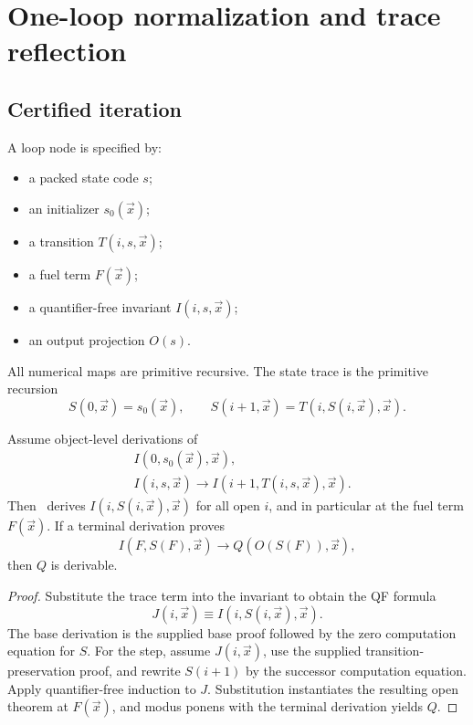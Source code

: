 \section{One-loop normalization and trace reflection}\label{sec:loop-normal}

\subsection{Certified iteration}

A loop node is specified by:
\begin{itemize}
  \item a packed state code \(s\);
  \item an initializer \(s_0(\vec x)\);
  \item a transition \(T(i,s,\vec x)\);
  \item a fuel term \(F(\vec x)\);
  \item a quantifier-free invariant \(I(i,s,\vec x)\);
  \item an output projection \(O(s)\).
\end{itemize}
All numerical maps are primitive recursive.  The state trace is the primitive recursion
\[
 S(0,\vec x)=s_0(\vec x),
 \qquad
 S(i+1,\vec x)=T(i,S(i,\vec x),\vec x).
\]

\begin{theorem}\label{thm:trace-reflection}
Assume object-level derivations of
\begin{align*}
 &I(0,s_0(\vec x),\vec x),\\
 &I(i,s,\vec x)\longrightarrow I(i+1,T(i,s,\vec x),\vec x).
\end{align*}
Then \iPRA\ derives \(I(i,S(i,\vec x),\vec x)\) for all open \(i\), and in particular at the fuel term \(F(\vec x)\).  If a terminal derivation proves
\[
 I(F,S(F),\vec x)\longrightarrow Q(O(S(F)),\vec x),
\]
then \(Q\) is derivable.
\end{theorem}

\begin{proof}
Substitute the trace term into the invariant to obtain the QF formula
\[
 J(i,\vec x)\equiv I(i,S(i,\vec x),\vec x).
\]
The base derivation is the supplied base proof followed by the zero computation equation for \(S\).  For the step, assume \(J(i,\vec x)\), use the supplied transition-preservation proof, and rewrite \(S(i+1)\) by the successor computation equation.  Apply quantifier-free induction to \(J\).  Substitution instantiates the resulting open theorem at \(F(\vec x)\), and modus ponens with the terminal derivation yields \(Q\).
\end{proof}

